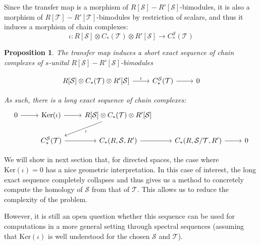 \documentclass[a4paper,fleqn]{cas-sc}
\newtheorem{prop}[thm]{Proposition}%
\newcommand{\cS}{{\mathcal{S}}}
\newcommand{\cT}{{\mathcal{T}}}
\begin{document}
Since the transfer map is a morphism of $R[\cS]-R'[\cS]$-bimodules, it is also a morphism of $R[\cT]-R'[\cT]$-bimodules by restriction of scalars, and thus it induces a morphism of chain complexes:  
\[\iota : 
R[\cS] \otimes C_{*}(\cT) \otimes R'[\cS]  
\to
C_{*}^{\cS}(\cT)
\]

\begin{prop}
The transfer map induces a short exact sequence of chain complexes of $s$-unital $R[\cS]-R'[\cS]$-bimodules

 \[\begin{tikzcd}
	R[\cS] \otimes C_{*}(\cT) \otimes R'[\cS]  & C_{*}^{\cS}(\cT) & 0
	\arrow["\iota", from=1-1, to=1-2]
	\arrow[ from=1-2, to=1-3]
\end{tikzcd}\]

As such, there is a long exact sequence of chain complexes:
\[\begin{tikzcd}
	0 & {\mathrm{Ker}( \iota)} & {R[\cS] \otimes C_{*}(\cT) \otimes R'[\cS]} \\
	& {C_{*}^{\cS}(\cT) } & {C_*(R, \cS, R')} & {C_*(R, \cS/ \cT, R')} & 0
	\arrow[from=1-1, to=1-2]
	\arrow[from=1-2, to=1-3]
	\arrow["\iota", from=1-3, to=2-2]
	\arrow[from=2-2, to=2-3]
	\arrow[from=2-3, to=2-4]
	\arrow[from=2-4, to=2-5]
\end{tikzcd}\]
\end{prop}
We will show in next section that, for directed spaces, the case where $ \mathrm{Ker}( \iota) = 0$ has a nice geometric interpretation. In this case of interest, the long exact sequence completely collapses and thus gives us a method to concretely compute the homology of $\cS$ from that of $\cT$. This allows us to reduce the complexity of the problem. 

However, it is still an open question whether this sequence can be used for computations in a more general setting through spectral sequences (assuming that $\mathrm{Ker}( \iota)$ is well understood for the chosen $\cS$ and $\cT$).

\end{document}
